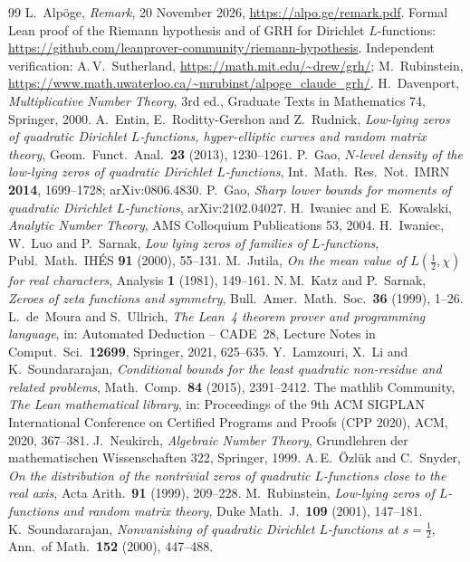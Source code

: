 \documentclass[11pt,colorlinks]{charlie}
\begin{document}
\begin{thebibliography}{99}\small
{} L.~Alp\"oge, \emph{Remark}, 20 November 2026, \url{https://alpo.ge/remark.pdf}. Formal Lean proof of the Riemann hypothesis and of GRH for Dirichlet $L$-functions: \url{https://github.com/leanprover-community/riemann-hypothesis}. Independent verification: A.\,V.~Sutherland, \url{https://math.mit.edu/~drew/grh/}; M.~Rubinstein, \url{https://www.math.uwaterloo.ca/~mrubinst/alpoge_claude_grh/}.
 H.~Davenport, \emph{Multiplicative Number Theory}, 3rd ed., Graduate Texts in Mathematics 74, Springer, 2000.
 A.~Entin, E.~Roditty-Gershon and Z.~Rudnick, \emph{Low-lying zeros of quadratic Dirichlet $L$-functions, hyper-elliptic curves and random matrix theory}, Geom.\ Funct.\ Anal.\ \textbf{23} (2013), 1230--1261.
 P.~Gao, \emph{$N$-level density of the low-lying zeros of quadratic Dirichlet $L$-functions}, Int.\ Math.\ Res.\ Not.\ IMRN \textbf{2014}, 1699--1728; arXiv:0806.4830.
 P.~Gao, \emph{Sharp lower bounds for moments of quadratic Dirichlet $L$-functions}, arXiv:2102.04027.
 H.~Iwaniec and E.~Kowalski, \emph{Analytic Number Theory}, AMS Colloquium Publications 53, 2004.
 H.~Iwaniec, W.~Luo and P.~Sarnak, \emph{Low lying zeros of families of $L$-functions}, Publ.\ Math.\ IH\'ES \textbf{91} (2000), 55--131.
 M.~Jutila, \emph{On the mean value of $L(\frac12,\chi)$ for real characters}, Analysis \textbf{1} (1981), 149--161.
 N.\,M.~Katz and P.~Sarnak, \emph{Zeroes of zeta functions and symmetry}, Bull.\ Amer.\ Math.\ Soc.\ \textbf{36} (1999), 1--26.
 L.~de~Moura and S.~Ullrich, \emph{The Lean~4 theorem prover and programming language}, in: Automated Deduction -- CADE~28, Lecture Notes in Comput.\ Sci.\ \textbf{12699}, Springer, 2021, 625--635.
 Y.~Lamzouri, X.~Li and K.~Soundararajan, \emph{Conditional bounds for the least quadratic non-residue and related problems}, Math.\ Comp.\ \textbf{84} (2015), 2391--2412.
 The mathlib Community, \emph{The Lean mathematical library}, in: Proceedings of the 9th ACM SIGPLAN International Conference on Certified Programs and Proofs (CPP 2020), ACM, 2020, 367--381.
 J.~Neukirch, \emph{Algebraic Number Theory}, Grundlehren der mathematischen Wissenschaften 322, Springer, 1999.
 A.\,E.~\"Ozl\"uk and C.~Snyder, \emph{On the distribution of the nontrivial zeros of quadratic $L$-functions close to the real axis}, Acta Arith.\ \textbf{91} (1999), 209--228.
 M.~Rubinstein, \emph{Low-lying zeros of $L$-functions and random matrix theory}, Duke Math.\ J.\ \textbf{109} (2001), 147--181.
 K.~Soundararajan, \emph{Nonvanishing of quadratic Dirichlet $L$-functions at $s=\frac12$}, Ann.\ of Math.\ \textbf{152} (2000), 447--488.
\end{thebibliography}
\end{document}
